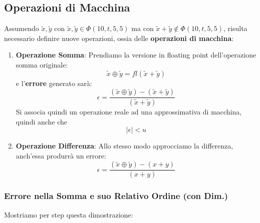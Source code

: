 \documentclass{article}
\begin{document}
\newpage

\subsection{Operazioni di Macchina}

Assumendo $\tilde{x},\tilde{y}$ con $\tilde{x},\tilde{y} \in \Phi(10,t,5,5)$ ma con $\tilde{x}+\tilde{y} \notin \Phi(10,t,5,5)$, risulta necessario definire nuove operazioni, ossia delle \textbf{operazioni di macchina}:
\begin{enumerate}
    \item \textbf{Operazione Somma}: Prendiamo la versione in floating point dell'operazione somma originale:
        \[\tilde{x} \oplus \tilde{y} = fl(\tilde{x}+\tilde{y})\]
    e l'\textbf{errore} generato sarà:
    \vspace*{10px}
    \[ \epsilon = \frac{(\tilde{x} \oplus \tilde{y}) - (\tilde{x} + \tilde{y})}{(\tilde{x} + \tilde{y})} \]
    \vspace*{10px}
    Si associa quindi un operazione reale ad una approssimativa di macchina, quindi anche che
    \[ |\epsilon| < u \]
    \item \textbf{Operazione Differenza}: Allo stesso modo approcciamo la differenza, anch'essa produrrà un errore:
    \vspace*{10px}
    \[ \epsilon = \frac{(\tilde{x} \oplus \tilde{y}) - (x + y)}{(x + y)} \]
    \vspace*{10px}
\end{enumerate}

\subsubsection{Errore nella Somma e suo Relativo Ordine (con Dim.)}

Mostriamo per step questa dimostrazione:
\end{document}
